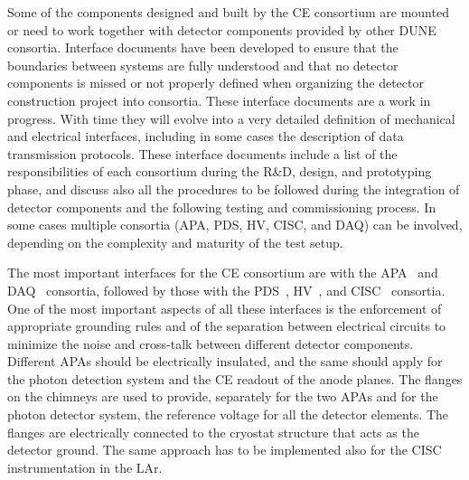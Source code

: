 Some of the components designed and built by the CE consortium are
mounted or need to work together with detector components provided by other DUNE
consortia. Interface documents have been developed to ensure that the boundaries
between systems are fully understood and that no detector components is missed or
not properly defined when organizing the detector construction project into
consortia. These interface documents are a work in progress. With time they will
evolve into a very detailed definition of mechanical and electrical interfaces,
including in some cases the description of data transmission protocols. These
interface documents include a list of the responsibilities of each consortium during the
R\&D, design, and prototyping phase, and discuss also all the procedures to be
followed during the integration of detector components and the following testing
and commissioning process. In some cases multiple consortia (APA, PDS, HV, CISC,
and DAQ) can be involved, depending on the complexity and maturity of the test
setup.

The most important interfaces for the CE consortium are with the APA~\cite{interface:did_ce_apa}
and DAQ~\cite{interface:did_ce_daq} consortia, followed by those with the
PDS~\cite{interface:did_pds_ce}, HV~\cite{interface:did_hv_ce}, and
CISC~\cite{interface:did_cisc_ce} consortia. One of the most important aspects
of all these interfaces is the enforcement of appropriate grounding rules and
of the separation between electrical circuits to minimize the noise and cross-talk
between different detector components. Different APAs should be electrically
insulated, and the same should apply for the photon detection system and the
CE readout of the anode planes. The flanges on the chimneys are used to provide,
separately for the two APAs and for the photon detector system, the reference
voltage for all the detector elements. The flanges are electrically connected
to the cryostat structure that acts as the detector ground. The same approach
has to be implemented also for the CISC instrumentation in the LAr.

